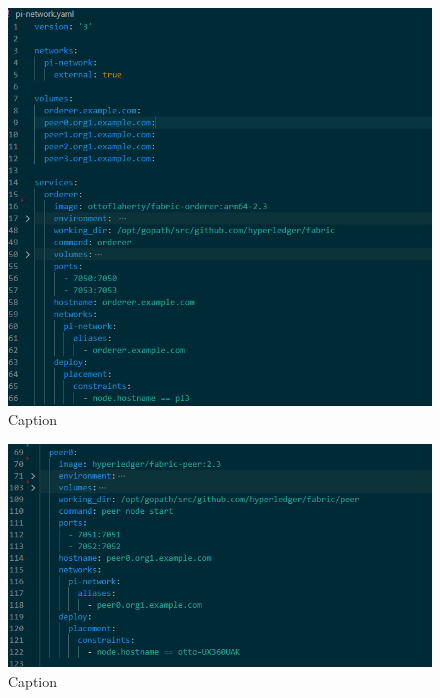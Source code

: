 \begin{figure}
    \centering
    \includegraphics[width=\textwidth]{pinetwork1.PNG}
    \caption{Caption}
    \label{fig:my_label}
\end{figure}

\begin{figure}
    \centering
    \includegraphics[width=\textwidth]{pinetwork2.PNG}
    \caption{Caption}
    \label{fig:my_label}
\end{figure}

